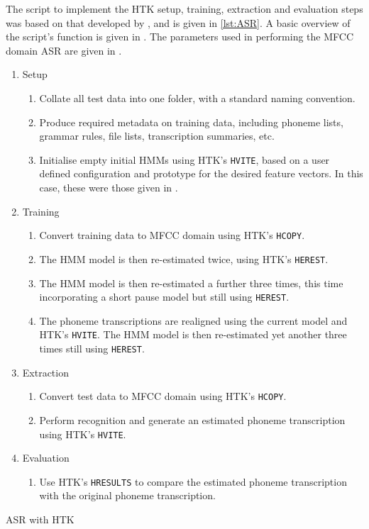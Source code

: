 The script to implement the \ac{HTK} setup, training, extraction
and evaluation steps was based on that developed by \citet{Quill2014},
and is given in \ref{lst:ASR}. A basic overview of the script's function
is given in . The parameters used in performing the \ac{MFCC}
domain \ac{ASR} are given in .

\begin{algorithm}
\begin{enumerate}
\item Setup

\begin{enumerate}
\item Collate all test data into one folder, with a standard naming convention.
\item Produce required metadata on training data, including phoneme lists,
grammar rules, file lists, transcription summaries, etc.
\item Initialise empty initial \acp{HMM} using \ac{HTK}'s \lstinline[language=bash]!HVITE!,
based on a user defined configuration and prototype for the desired
feature vectors. In this case, these were those given in .
\end{enumerate}
\item Training

\begin{enumerate}
\item Convert training data to \ac{MFCC} domain using \ac{HTK}'s \lstinline[language=bash]!HCOPY!.
\item The \ac{HMM} model is then re-estimated twice, using \ac{HTK}'s
\lstinline[language=bash]!HEREST!.
\item The \ac{HMM} model is then re-estimated a further three times, this
time incorporating a short pause model but still using \lstinline[language=bash]!HEREST!.
\item The phoneme transcriptions are realigned using the current model and
\ac{HTK}'s \lstinline[language=bash]!HVITE!. The \ac{HMM} model
is then re-estimated yet another three times still using \lstinline[language=bash]!HEREST!.
\end{enumerate}
\item Extraction

\begin{enumerate}
\item Convert test data to \ac{MFCC} domain using \ac{HTK}'s \lstinline[language=bash]!HCOPY!.
\item Perform recognition and generate an estimated phoneme transcription
using \ac{HTK}'s \lstinline[language=bash]!HVITE!.
\end{enumerate}
\item Evaluation

\begin{enumerate}
\item Use \ac{HTK}'s \lstinline[language=bash]!HRESULTS! to compare the
estimated phoneme transcription with the original phoneme transcription.
\end{enumerate}
\end{enumerate}
\protect\caption{\label{alg:ASR} \acs{ASR} with \acs{HTK}}
\end{algorithm}


